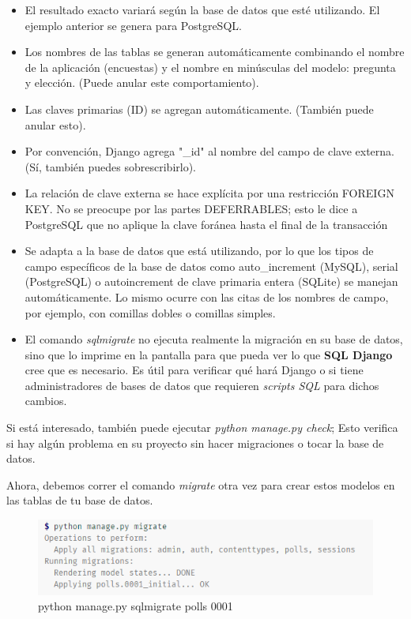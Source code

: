\documentclass[10pt]{article}
\newcommand{\django}[1]{{\textcolor{G}{Django} #1}}
\begin{document}
\begin{itemize}
\item 
El resultado exacto variará según la base de datos que esté utilizando. El ejemplo anterior se genera para PostgreSQL.

\item
Los nombres de las tablas se generan automáticamente combinando el nombre de la aplicación (encuestas) y el nombre en minúsculas del modelo: pregunta y elección. (Puede anular este comportamiento).

\item 
Las claves primarias (ID) se agregan automáticamente. (También puede anular esto).

\item 
Por convención, \django{} agrega "\_id" al nombre del campo de clave externa. (Sí, también puedes sobrescribirlo).

\item 
La relación de clave externa se hace explícita por una restricción FOREIGN KEY. No se preocupe por las partes DEFERRABLES; esto le dice a PostgreSQL que no aplique la clave foránea hasta el final de la transacción

\item 
Se adapta a la base de datos que está utilizando, por lo que los tipos de campo específicos de la base de datos como auto\_increment (MySQL), serial (PostgreSQL) o autoincrement de clave primaria entera (SQLite) se manejan automáticamente. Lo mismo ocurre con las citas de los nombres de campo, por ejemplo, con comillas dobles o comillas simples.

\item 
El comando \textit{sqlmigrate} no ejecuta realmente la migración en su base de datos, sino que lo imprime en la pantalla para que pueda ver lo que \textbf{SQL Django} cree que es necesario. Es útil para verificar qué hará \django{} o si tiene administradores de bases de datos que requieren \textit{scripts SQL} para dichos cambios.
\end{itemize}

Si está interesado, también puede ejecutar \textit{python manage.py check}; Esto verifica si hay algún problema en su proyecto sin hacer migraciones o tocar la base de datos.

Ahora, debemos correr el comando \textit{migrate} otra vez para crear estos modelos en las tablas de tu base de datos.

\begin{figure}[H]
\begin{center}
\includegraphics[scale=1]{figuras/3/32/323/img4.png}
\renewcommand{\arraystretch}{1.3}
\caption{python manage.py sqlmigrate polls 0001}
\end{center}
\end{figure}
\end{document}

